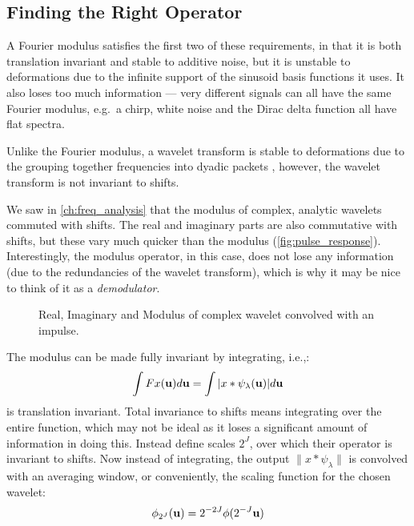 \subsection{Finding the Right Operator}
  A Fourier modulus satisfies the first two of these requirements, in that it is
  both translation invariant and stable to additive noise, but it is unstable to
  deformations due to the infinite support of the sinusoid basis functions it
  uses. It also loses too much information --- very different signals can all
  have the same Fourier modulus, e.g.\ a chirp, white noise and the Dirac delta
  function all have flat spectra.

  Unlike the Fourier modulus, a wavelet transform
  is stable to deformations due to the grouping together frequencies into dyadic
  packets \citep{mallat_group_2012}, however, the wavelet transform is not invariant to
  shifts. 
  
  We saw in \autoref{ch:freq_analysis} that the modulus of complex, analytic
  wavelets commuted with shifts. The real and imaginary parts are also
  commutative with shifts, but these vary much quicker than the modulus
  (\autoref{fig:pulse_response}).  Interestingly, the modulus operator, in this
  case, does not lose any information \citep{waldspurger_phase_2012} (due to the
  redundancies of the wavelet transform), which is why it may be nice to think
  of it as a \emph{demodulator}.

  \begin{figure}
    \begin{center}
      \newlength\figureheight 
      \newlength\figurewidth 
      \setlength\figureheight{6cm} 
      \setlength\figurewidth{8cm}
      \caption{Real, Imaginary and Modulus of complex wavelet convolved with
               an impulse.}
      \label{fig:pulse_response}
    \end{center}
  \end{figure}
  


  The modulus can be made fully invariant by integrating, i.e.,:
  $$\int F x(\mathbf{u})d\mathbf{u}= \int | x \ast \psi_{\lambda}(\mathbf{u})| d\mathbf{u}$$
  is translation invariant. 
  Total invariance to shifts means integrating over the entire function, which
  may not be ideal as it loses a significant amount of information in doing this. Instead
  \citeauthor{bruna_invariant_2013} define scales $2^J$, over which their operator
  is invariant to shifts. Now instead of integrating, the output $\|x \ast \psi_{\lambda}\|$ is
  convolved with an averaging window, or conveniently, the scaling function for
  the chosen wavelet:
  $$\phi_{2^J}(\mathbf{u}) = 2^{-2J}\phi(2^{-J}\mathbf{u})$$


